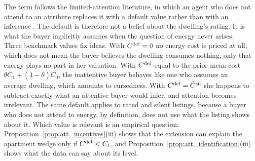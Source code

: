 The term follows the limited-attention literature, in which an agent who does not attend to an attribute replaces it with a default value rather than with an inference \citep{gabaix_sparsity_2014, gabaix_behavioral_2019}. The default is therefore not a belief about the dwelling's rating. It is what the buyer implicitly assumes when the question of energy never arises. Three benchmark values fix ideas. With $C^{\rm def}=0$ no energy cost is priced at all, which does not mean the buyer believes the dwelling consumes nothing, only that energy plays no part in her valuation. With $C^{\rm def}$ equal to the prior mean cost $\bar\theta C_1+(1-\bar\theta)C_0$, the inattentive buyer behaves like one who assumes an average dwelling, which amounts to cursedness. With $C^{\rm def}=\bar C^{\rm sil}$ she happens to subtract exactly what an attentive buyer would infer, and attention becomes irrelevant. The same default applies to rated and silent listings, because a buyer who does not attend to energy, by definition, does not use what the listing shows about it. Which value is relevant is an empirical question: Proposition~\ref{prop:att_incentives}(iii) shows that the extension can explain the apartment wedge only if $C^{\rm def}<C_1$, and Proposition~\ref{prop:att_identification}(iii) shows what the data can say about its level.
